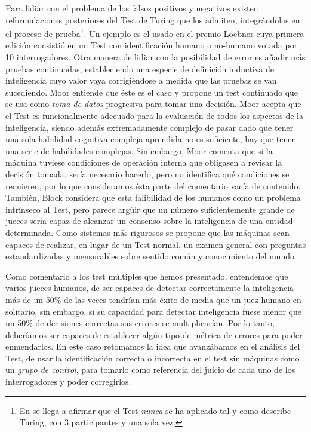 \documentclass[12pt]{memoir}
\begin{document}
Para lidiar con el problema de los falsos positivos y negativos existen reformulaciones posteriores del Test de Turing que los admiten, integrándolos en el proceso de prueba\footnote{En \parencite[apartado 6.1]{afterTuring} se llega a afirmar que el Test \textit{nunca} se ha aplicado tal y como describe Turing, con 3 participantes y una sola vez.}. Un ejemplo es el usado en el premio Loebner \parencite[apartado 6.1]{afterTuring} cuya primera edición consistió en un Test con identificación humano o no-humano votada por 10 interrogadores. Otra manera de lidiar con la posibilidad de error es añadir más pruebas continuadas, estableciendo una especie de definición inductiva de inteligencia cuyo valor vaya corrigiéndose a medida que las pruebas se van sucediendo. Moor \parencite[apartado 3.4]{afterTuring} entiende que éste es el caso y propone un test continuado que se usa como \textit{toma de datos} progresiva para tomar una decisión. Moor acepta que el Test es funcionalmente adecuado para la evaluación de todos los aspectos de la inteligencia, siendo además extremadamente complejo de pasar dado que tener una sola habilidad cognitiva compleja aprendida no es suficiente, hay que tener una serie de habilidades complejas. Sin embargo, Moor comenta que si la máquina tuviese condiciones de operación interna que obligasen a revisar la decisión tomada, sería necesario hacerlo, pero no identifica qué condiciones se requieren, por lo que consideramos ésta parte del comentario vacía de contenido. También, Block \parencite[apartado 4.1]{afterTuring} considera que esta falibilidad de los humanos como un problema intrínseco al Test, pero parece argüir que un número suficientemente grande de jueces sería capaz de alcanzar un consenso sobre la inteligencia de una entidad determinada. Como sistemas más rigurosos se propone que las máquinas sean capaces de realizar, en lugar de un Test normal, un examen general con preguntas estandardizadas y mensurables sobre sentido común y conocimiento del mundo \parencite{standardTesting}.

Como comentario a los test múltiples que hemos presentado, entendemos que varios jueces humanos, de ser capaces de detectar correctamente la inteligencia más de un 50\% de las veces tendrían más éxito de media que un juez humano en solitario, sin embargo, si su capacidad para detectar inteligencia fuese menor que un 50\% de decisiones correctas sus errores se multiplicarían. Por lo tanto, deberíamos ser capaces de establecer algún tipo de métrica de errores para poder enmendarlos. En este caso retomamos la idea que avanzábamos en el análisis del Test, de usar la identificación correcta o incorrecta en el test sin máquinas como un \textit{grupo de control}, para tomarlo como referencia del juicio de cada uno de los interrogadores y poder corregirlos.
\end{document}
